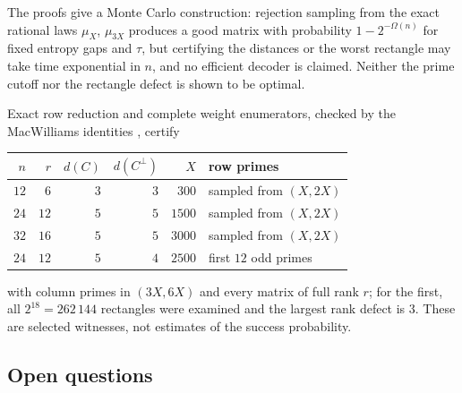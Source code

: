 The proofs give a Monte Carlo construction: rejection sampling from the exact rational laws $\mu_X$, $\mu_{3X}$
produces a good matrix with probability $1-2^{-\Omega(n)}$ for fixed entropy gaps and $\tau$, but certifying the
distances or the worst rectangle may take time exponential in $n$, and no efficient decoder is claimed. Neither
the prime cutoff nor the rectangle defect is shown to be optimal.

\begin{example}\label{dir:ex:legendre}
Exact row reduction and complete weight enumerators, checked by the MacWilliams identities
\cite{MacWilliamsSloane1977Theory}, certify
\begin{center}\small
\begin{tabular}{@{}rrrrrl@{}}
\toprule
$n$ & $r$ & $d(C)$ & $d(C^\perp)$ & $X$ & row primes\\
\midrule
$12$ & $6$ & $3$ & $3$ & $300$ & sampled from $(X,2X)$\\
$24$ & $12$ & $5$ & $5$ & $1500$ & sampled from $(X,2X)$\\
$32$ & $16$ & $5$ & $5$ & $3000$ & sampled from $(X,2X)$\\
$24$ & $12$ & $5$ & $4$ & $2500$ & first $12$ odd primes\\
\bottomrule
\end{tabular}
\end{center}
with column primes in $(3X,6X)$ and every matrix of full rank $r$; for the first, all $2^{18}=262\,144$
rectangles were examined and the largest rank defect is $3$. These are selected witnesses, not estimates of
the success probability.
\end{example}

\subsection{Open questions}\label{prd:sec:open}
{\raggedright{}}

